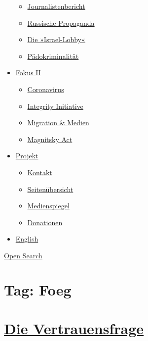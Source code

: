 \begin{itemize}
  \begin{itemize}
  \tightlist
  \item
    \href{https://swprs.org/bericht-eines-journalisten/}{Journalistenbericht}
  \item
    \href{https://swprs.org/russische-propaganda/}{Russische Propaganda}
  \item
    \href{https://swprs.org/die-israel-lobby-fakten-und-mythen/}{Die
    »Israel-Lobby«}
  \item
    \href{https://swprs.org/geopolitik-und-paedokriminalitaet/}{Pädokriminalität}
  \end{itemize}
\item
  \href{https://swprs.org/migration-und-medien/}{Fokus II}

  \begin{itemize}
  \tightlist
  \item
    \href{https://swprs.org/covid-19-hinweis-ii/}{Coronavirus}
  \item
    \href{https://swprs.org/die-integrity-initiative/}{Integrity
    Initiative}
  \item
    \href{https://swprs.org/migration-und-medien/}{Migration \& Medien}
  \item
    \href{https://swprs.org/der-fall-magnitsky/}{Magnitsky Act}
  \end{itemize}
\item
  \href{https://swprs.org/kontakt/}{Projekt}

  \begin{itemize}
  \tightlist
  \item
    \href{https://swprs.org/kontakt/}{Kontakt}
  \item
    \href{https://swprs.org/uebersicht/}{Seitenübersicht}
  \item
    \href{https://swprs.org/medienspiegel/}{Medienspiegel}
  \item
    \href{https://swprs.org/donationen/}{Donationen}
  \end{itemize}
\item
  \href{https://swprs.org/contact/}{English}
\end{itemize}

\protect\hyperlink{}{Open Search}

\hypertarget{tag-foeg}{%
\section{Tag: Foeg}\label{tag-foeg}}

\hypertarget{die-vertrauensfrage}{%
\section{\texorpdfstring{\href{https://swprs.org/2017/03/01/schweizer-medien-vertrauen/}{Die
Vertrauensfrage}}{Die Vertrauensfrage}}\label{die-vertrauensfrage}}

